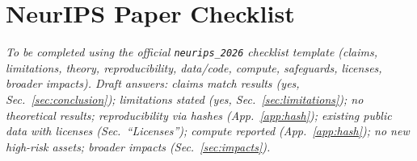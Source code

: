 \section*{NeurIPS Paper Checklist}
\textit{To be completed using the official \texttt{neurips\_2026} checklist template (claims, limitations, theory, reproducibility, data/code, compute, safeguards, licenses, broader impacts). Draft answers: claims match results (yes, Sec.~\ref{sec:conclusion}); limitations stated (yes, Sec.~\ref{sec:limitations}); no theoretical results; reproducibility via hashes (App.~\ref{app:hash}); existing public data with licenses (Sec.~``Licenses''); compute reported (App.~\ref{app:hash}); no new high-risk assets; broader impacts (Sec.~\ref{sec:impacts}).}
